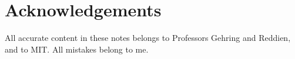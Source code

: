 \section*{Acknowledgements}

All accurate content in these notes belongs to Professors Gehring and Reddien, and to MIT.
All mistakes belong to me. 
